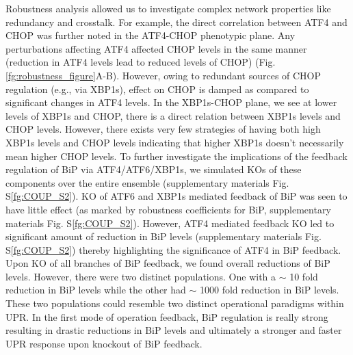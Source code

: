 \documentclass[fleqn,10pt]{wlscirep}
\begin{document}
Robustness analysis allowed us to investigate complex network properties like redundancy and crosstalk. For example, the direct correlation between ATF4 and CHOP was further noted in the ATF4-CHOP phenotypic plane. Any perturbations affecting ATF4 affected CHOP levels in the same manner (reduction in ATF4 levels lead to reduced levels of CHOP) (Fig. \ref{fg:robustness_figure}A-B). However, owing to redundant sources of CHOP regulation (e.g., via XBP1s), effect on CHOP is damped as compared to significant changes in ATF4 levels. In the XBP1s-CHOP plane, we see at lower levels of XBP1s and CHOP, there is a direct relation between XBP1s levels and CHOP levels. However, there exists very few strategies of having both high XBP1s levels and CHOP levels indicating that higher XBP1s doesn't necessarily mean higher CHOP levels. To further investigate the implications of the feedback regulation of BiP via ATF4/ATF6/XBP1s, we simulated KOs of these components over the entire ensemble (supplementary materials Fig. S\ref{fg:COUP_S2}). KO of ATF6 and XBP1s mediated feedback of BiP was seen to have little effect (as marked by robustness coefficients for BiP, supplementary materials Fig. S\ref{fg:COUP_S2}). However, ATF4 mediated feedback KO led to significant amount of reduction in BiP levels (supplementary materials Fig. S\ref{fg:COUP_S2}) thereby highlighting the significance of ATF4 in BiP feedback. Upon KO of all branches of BiP feedback, we found overall reductions of BiP levels. However, there were two distinct populations. One with a $\sim$ 10 fold reduction in BiP levels while the other had $\sim$ 1000 fold reduction in BiP levels. These two populations could resemble two distinct operational paradigms within UPR. In the first mode of operation feedback, BiP regulation is really strong resulting in drastic reductions in BiP levels and ultimately a stronger and faster UPR response upon knockout of BiP feedback. 
\end{document}
